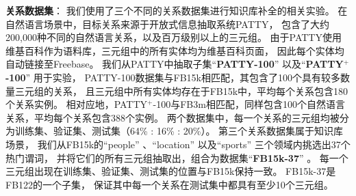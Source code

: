 \textbf{关系数据集}：
我们使用了三个不同的关系数据集进行知识库补全的相关实验。
在自然语言场景中，目标关系来源于开放式信息抽取系统PATTY\cite{nakashole2012patty}，
包含了大约200,000种不同的自然语言关系，以及百万级别以上的三元组。
由于PATTY使用维基百科作为语料库，三元组中的所有实体均为维基百科页面，
因此每个实体均自动链接至Freebase。
我们从PATTY中抽取子集``\textbf{PATTY-100}'' 以及``\textbf{PATTY$^+$-100}'' 用于实验，
PATTY-100数据集与FB15k相匹配，其包含了100个具有较多数量三元组的关系，
且三元组中所有实体均存在于FB15k中，平均每个关系包含180个关系实例。
相对应地，PATTY$^+$-100与FB3m相匹配，同样包含100个自然语言关系，平均每个关系包含388个实例。
两个数据集中，每一个关系的三元组均被分为训练集、验证集、测试集（64\% : 16\% : 20\%）。
第三个关系数据集属于知识库场景，
我们从FB15k的``people'' 、``location'' 以及``sports'' 三个领域内挑选出37个热门谓词，
并将它们的所有三元组抽取出，组合为数据集``\textbf{FB15k-37}'' 。
每一个三元组出现在训练集、验证集、测试集的位置与FB15k保持一致。
FB15k-37是FB122\cite{guo2016jointly}的一个子集，
保证其中每一个关系在测试集中都具有至少10个三元组。


